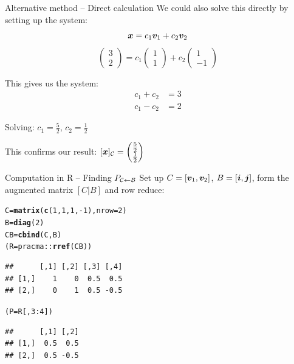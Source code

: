 \documentclass[aspectratio=169]{beamer}\usepackage[]{graphicx}\usepackage[]{xcolor}
\makeatletter
\newcommand{\hlnum}[1]{\textcolor[rgb]{0.686,0.059,0.569}{#1}}%
\newcommand{\hlopt}[1]{\textcolor[rgb]{0,0,0}{#1}}%
\newcommand{\hldef}[1]{\textcolor[rgb]{0.345,0.345,0.345}{#1}}%
\newcommand{\hlkwb}[1]{\textcolor[rgb]{0.69,0.353,0.396}{#1}}%
\newcommand{\hlkwc}[1]{\textcolor[rgb]{0.333,0.667,0.333}{#1}}%
\newcommand{\hlkwd}[1]{\textcolor[rgb]{0.737,0.353,0.396}{\textbf{#1}}}%
\newenvironment{kframe}{%
 \def\at@end@of@kframe{}%
 \ifinner\ifhmode%
  \def\at@end@of@kframe{\end{minipage}}%
  \begin{minipage}{\columnwidth}%
 \fi\fi%
 \def\FrameCommand##1{\hskip\@totalleftmargin \hskip-\fboxsep
 \colorbox{shadecolor}{##1}\hskip-\fboxsep
     \hskip-\linewidth \hskip-\@totalleftmargin \hskip\columnwidth}%
 \MakeFramed {\advance\hsize-\width
   \@totalleftmargin\z@ \linewidth\hsize
   \@setminipage}}%
 {\par\unskip\endMakeFramed%
 \at@end@of@kframe}
\newenvironment{knitrout}{}{} %
\makeatother
\begin{document}
\begin{frame}{Alternative method -- Direct calculation}
We could also solve this directly by setting up the system:
$$\bm{x} = c_1\bm{v}_1 + c_2\bm{v}_2$$
$$\begin{pmatrix} 3 \\ 2 \end{pmatrix} = c_1\begin{pmatrix} 1 \\ 1 \end{pmatrix} + c_2\begin{pmatrix} 1 \\ -1 \end{pmatrix}$$

This gives us the system:
\begin{align*}
c_1 + c_2 &= 3 \\
c_1 - c_2 &= 2
\end{align*}

Solving: $c_1 = \frac{5}{2}$, $c_2 = \frac{1}{2}$

\vfill
This confirms our result: $[\bm{x}]_{\mathcal{C}} = \begin{pmatrix} \frac{5}{2} \\ \frac{1}{2} \end{pmatrix}$
\end{frame}

\begin{frame}[fragile]{Computation in R -- Finding $P_{\mathcal{C}\leftarrow\mathcal{B}}$}
Set up $C = [\bm{v}_1, \bm{v}_2]$, $B = [\bm{i}, \bm{j}]$, form the augmented matrix $[C|B]$ and row reduce:
\vfill
\begin{knitrout}
\color{fgcolor}\begin{kframe}
\begin{alltt}
\hldef{C} \hlkwb{=} \hlkwd{matrix}\hldef{(}\hlkwd{c}\hldef{(}\hlnum{1}\hldef{,} \hlnum{1}\hldef{,} \hlnum{1}\hldef{,} \hlopt{-}\hlnum{1}\hldef{),} \hlkwc{nrow} \hldef{=} \hlnum{2}\hldef{)}
\hldef{B} \hlkwb{=} \hlkwd{diag}\hldef{(}\hlnum{2}\hldef{)}
\hldef{CB} \hlkwb{=} \hlkwd{cbind}\hldef{(C, B)}
\hldef{(R} \hlkwb{=} \hldef{pracma}\hlopt{::}\hlkwd{rref}\hldef{(CB))}
\end{alltt}
\begin{verbatim}
##      [,1] [,2] [,3] [,4]
## [1,]    1    0  0.5  0.5
## [2,]    0    1  0.5 -0.5
\end{verbatim}
\begin{alltt}
\hldef{(P} \hlkwb{=} \hldef{R[,} \hlnum{3}\hlopt{:}\hlnum{4}\hldef{])}
\end{alltt}
\begin{verbatim}
##      [,1] [,2]
## [1,]  0.5  0.5
## [2,]  0.5 -0.5
\end{verbatim}
\end{kframe}
\end{knitrout}
\end{frame}
\end{document}
